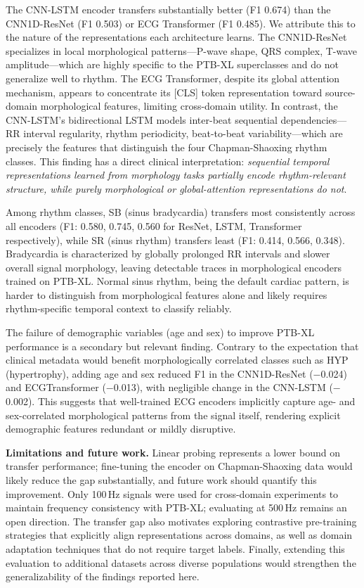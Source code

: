 \documentclass[journal]{IEEEtran}
\begin{document}
The CNN-LSTM encoder transfers substantially better (F1 0.674) than
the CNN1D-ResNet (F1 0.503) or ECG Transformer (F1 0.485). We attribute
this to the nature of the representations each architecture learns. The
CNN1D-ResNet specializes in local morphological patterns---P-wave shape,
QRS complex, T-wave amplitude---which are highly specific to the
PTB-XL superclasses and do not generalize well to rhythm. The ECG
Transformer, despite its global attention mechanism, appears to
concentrate its [CLS] token representation toward source-domain
morphological features, limiting cross-domain utility. In contrast, the
CNN-LSTM's bidirectional LSTM models inter-beat sequential
dependencies---RR interval regularity, rhythm periodicity,
beat-to-beat variability---which are precisely the features that
distinguish the four Chapman-Shaoxing rhythm classes. This finding
has a direct clinical interpretation: \textit{sequential temporal
representations learned from morphology tasks partially encode
rhythm-relevant structure, while purely morphological or global-attention
representations do not}.

Among rhythm classes, SB (sinus bradycardia) transfers most
consistently across all encoders (F1: 0.580, 0.745, 0.560 for ResNet,
LSTM, Transformer respectively), while SR (sinus rhythm) transfers
least (F1: 0.414, 0.566, 0.348). Bradycardia is characterized by
globally prolonged RR intervals and slower overall signal morphology,
leaving detectable traces in morphological encoders trained on PTB-XL.
Normal sinus rhythm, being the default cardiac pattern, is harder to
distinguish from morphological features alone and likely requires
rhythm-specific temporal context to classify reliably.

The failure of demographic variables (age and sex) to improve PTB-XL
performance is a secondary but relevant finding. Contrary to the
expectation that clinical metadata would benefit morphologically
correlated classes such as HYP (hypertrophy), adding age and sex
reduced F1 in the CNN1D-ResNet ($-$0.024) and ECGTransformer
($-$0.013), with negligible change in the CNN-LSTM ($-$0.002). This
suggests that well-trained ECG encoders implicitly capture
age- and sex-correlated morphological patterns from the signal itself,
rendering explicit demographic features redundant or mildly disruptive.

\textbf{Limitations and future work.} Linear probing represents a
lower bound on transfer performance; fine-tuning the encoder on
Chapman-Shaoxing data would likely reduce the gap substantially,
and future work should quantify this improvement. Only 100\,Hz
signals were used for cross-domain experiments to maintain frequency
consistency with PTB-XL; evaluating at 500\,Hz remains an open
direction. The transfer gap also motivates exploring contrastive
pre-training strategies \cite{mehari2022selfsupervised} that
explicitly align representations across domains, as well as
domain adaptation techniques \cite{niu2020domain} that do not require target labels.
Finally, extending this evaluation to additional datasets across
diverse populations would strengthen the generalizability of
the findings reported here.
\end{document}
